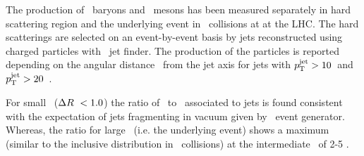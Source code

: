 The production of \lda\ baryons and \ks\ mesons has been measured separately in hard scattering region and the underlying event in \pPb\ collisions at  at the LHC.
The hard scatterings are selected on an event-by-event basis by jets reconstructed using charged particles with \akT\ jet finder. The production of the particles is reported depending on the angular distance \dr\ from the jet axis for jets with $p_{\mathrm{T}}^{\mathrm{jet}} > 10$~\gevc and $p_{\mathrm{T}}^{\mathrm{jet}} > 20$~\gevc.


For small \dr\ ($\Delta R\ < 1.0$) the ratio of \lda\ to \ks\ associated to jets is found consistent with the expectation of jets fragmenting in vacuum given by \pythia\ event generator. Whereas, the ratio for large \dr\ (i.e. the underlying event) shows a maximum (similar to the inclusive distribution in \pPb\ collisions) at the intermediate \pt\ of 2-5 \gevc. 




